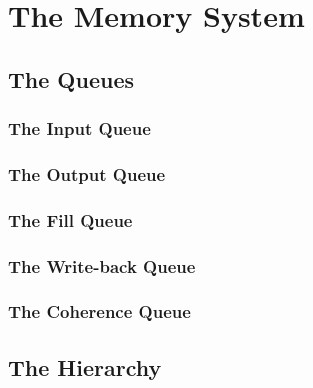 
\clearpage
\section{The Memory System}



\subsection{The Queues}

\subsubsection{The Input Queue}
\subsubsection{The Output Queue}
\subsubsection{The Fill Queue}
\subsubsection{The Write-back Queue}
\subsubsection{The Coherence Queue}



\subsection{The Hierarchy}



